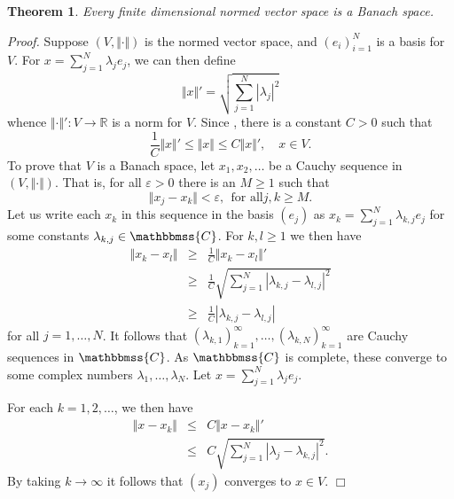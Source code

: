 \documentclass[12pt]{article}
\newcommand{\sR}[0]{\mathbb{R}}
\newcommand{\C}{\mathbbmss{C}}
\newtheorem{thm}{Theorem}
\begin{document}
\begin{thm}
Every finite dimensional normed vector space is a Banach space.
\end{thm}

\emph{Proof.} Suppose $(V,\Vert\cdot\Vert)$ is the normed vector space, 
    and $(e_i)_{i=1}^N$ is a basis for $V$. 
For $x=\sum_{j=1}^N \lambda_j e_j$, we can then define 
$$
  \Vert x \Vert' = \sqrt{\sum_{j=1}^N |\lambda_j|^2}
$$
whence $\Vert\cdot\Vert'\colon V\to \sR$ is a norm for $V$. 
Since 
, 
there is a constant $C>0$ such that
$$
 \frac{1}{C} \Vert x \Vert' \le \Vert x \Vert \le C \Vert x \Vert', \quad x\in V.
$$
To prove that $V$ is a Banach space, let $x_1,x_2,\ldots$ be a Cauchy sequence
in $(V,\Vert\cdot \Vert)$. That is, 
   for all $\varepsilon>0$ there is an $M\ge 1$ such that 
$$
  \Vert x_j-x_k \Vert <\varepsilon, \ \ \mbox{for all} j,k\ge M.
$$
Let us write each $x_k$ in this sequence in the basis $(e_j)$ 
   as $x_k=\sum_{j=1}^N \lambda_{k,j} e_j$ for some constants 
   $\lambda_{k,j}\in \C$. 
For $k,l\ge 1$ we then have
\begin{eqnarray*}
\Vert x_k-x_l\Vert   &\ge& \frac{1}{C} \Vert x_k-x_l \Vert' \\
   &\ge& \frac{1}{C} \sqrt{\sum_{j=1}^N |\lambda_{k,j}-\lambda_{l,j}|^2} \\
   &\ge& \frac{1}{C} |\lambda_{k,j}-\lambda_{l,j}|
\end{eqnarray*}
for all $j=1,\ldots, N$.
It follows that 
   $(\lambda_{k,1})_{k=1}^\infty, \ldots, (\lambda_{k,N})_{k=1}^\infty$
   are Cauchy sequences in $\C$. As $\C$ is complete, these converge to 
   some complex numbers $\lambda_1, \ldots, \lambda_N$. 
   Let $x=\sum_{j=1}^N \lambda_j e_j$. 

For each $k=1,2,\ldots$, we then have
\begin{eqnarray*}
\Vert x-x_k\Vert &\le& C \Vert x-x_k\Vert' \\
                 &\le& C \sqrt{\sum_{j=1}^N |\lambda_{j}-\lambda_{k,j}|^2}.
\end{eqnarray*}
By taking $k\to \infty$ it follows that $(x_j)$ converges to $x\in V$. $\Box$
\end{document}

